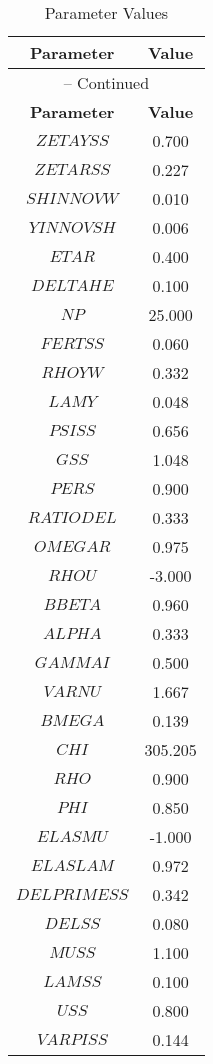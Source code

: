 \begin{center}
\begin{longtable}{cc}
\caption{Parameter Values}\\%
\toprule%
\multicolumn{1}{c}{\textbf{Parameter}} &
\multicolumn{1}{c}{\textbf{Value}}  \\%
\midrule%
\endfirsthead
\multicolumn{2}{c}{{\tablename} \thetable{} -- Continued}\\%
\midrule%
\multicolumn{1}{c}{\textbf{Parameter}} &
\multicolumn{1}{c}{\textbf{Value}} \\%
\midrule%
\endhead
$ZETAYSS$ 	 & 	 0.700 \\
$ZETARSS$ 	 & 	 0.227 \\
$SHINNOVW$ 	 & 	 0.010 \\
$YINNOVSH$ 	 & 	 0.006 \\
$ETAR$ 	 & 	 0.400 \\
$DELTAHE$ 	 & 	 0.100 \\
$NP$ 	 & 	 25.000 \\
$FERTSS$ 	 & 	 0.060 \\
$RHOYW$ 	 & 	 0.332 \\
$LAMY$ 	 & 	 0.048 \\
$PSISS$ 	 & 	 0.656 \\
$GSS$ 	 & 	 1.048 \\
$PERS$ 	 & 	 0.900 \\
$RATIODEL$ 	 & 	 0.333 \\
$OMEGAR$ 	 & 	 0.975 \\
$RHOU$ 	 & 	 -3.000 \\
$BBETA$ 	 & 	 0.960 \\
$ALPHA$ 	 & 	 0.333 \\
$GAMMAI$ 	 & 	 0.500 \\
$VARNU$ 	 & 	 1.667 \\
$BMEGA$ 	 & 	 0.139 \\
$CHI$ 	 & 	 305.205 \\
$RHO$ 	 & 	 0.900 \\
$PHI$ 	 & 	 0.850 \\
$ELASMU$ 	 & 	 -1.000 \\
$ELASLAM$ 	 & 	 0.972 \\
$DELPRIMESS$ 	 & 	 0.342 \\
$DELSS$ 	 & 	 0.080 \\
$MUSS$ 	 & 	 1.100 \\
$LAMSS$ 	 & 	 0.100 \\
$USS$ 	 & 	 0.800 \\
$VARPISS$ 	 & 	 0.144 \\

\end{longtable}
\end{center}
